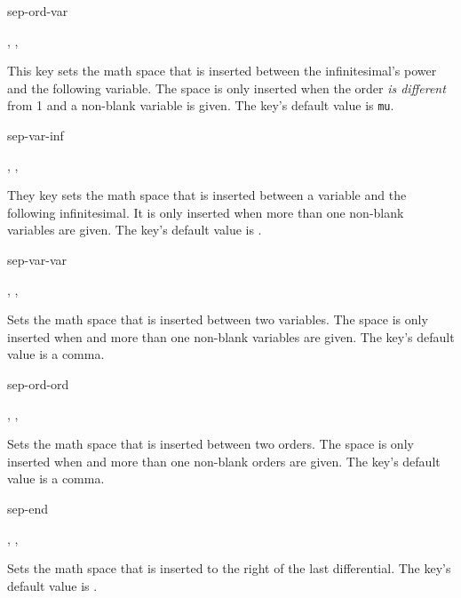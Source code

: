 	\begin{option}{sep-ord-var}
		\begin{values}[default = 0]
			, , 
		\end{values}
		This key sets the math space that is inserted between the infinitesimal's power and the following variable. The space is only inserted when the order \emph{is different} from \num{1} and a non-blank variable is given. The key's default value is  \texttt{mu}.
	\end{option}
	
	\begin{option}{sep-var-inf}
		\begin{values}[default = \cs{mathop}\{\}\cs{!}]
			, , 
		\end{values}
		They key sets the math space that is inserted between a variable and the following infinitesimal. It is only inserted when more than one non-blank variables are given. The key's default value is .
	\end{option}
	
	\begin{option}{sep-var-var}
		\begin{values}[default = {{,}}]
			, , 
		\end{values}
		Sets the math space that is inserted between two variables. The space is only inserted when  and more than one non-blank variables are given. The key's default value is a comma.
	\end{option}
	
	\begin{option}{sep-ord-ord}
		\begin{values}[default = {{,}}]
			, , 
		\end{values}
		Sets the math space that is inserted between two orders. The space is only inserted when  and more than one non-blank orders are given. The key's default value is a comma.
	\end{option}
	
	\begin{option}{sep-end}
		\begin{values}[default = 0]
			, , 
		\end{values}
		Sets the math space that is inserted to the right of the last differential. The key's default value is .
	\end{option}
	
